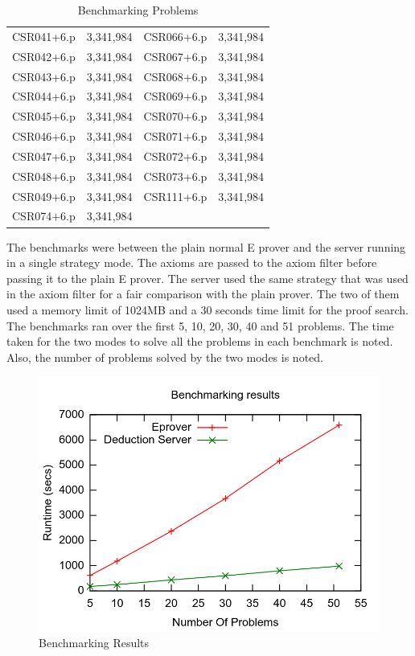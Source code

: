 \begin{table}[ht]
\begin{center}
\begin{tabular}{c|c||c|c}
      CSR041+6.p   & 3,341,984          & CSR066+6.p   & 3,341,984 \\
      CSR042+6.p   & 3,341,984          & CSR067+6.p   & 3,341,984 \\
      CSR043+6.p   & 3,341,984          & CSR068+6.p   & 3,341,984 \\
      CSR044+6.p   & 3,341,984          & CSR069+6.p   & 3,341,984 \\
      CSR045+6.p   & 3,341,984          & CSR070+6.p   & 3,341,984 \\
      CSR046+6.p   & 3,341,984          & CSR071+6.p   & 3,341,984 \\
      CSR047+6.p   & 3,341,984          & CSR072+6.p   & 3,341,984 \\
      CSR048+6.p   & 3,341,984          & CSR073+6.p   & 3,341,984 \\
      CSR049+6.p   & 3,341,984          & CSR111+6.p   & 3,341,984 \\
      CSR074+6.p   & 3,341,984          &              &           \\
      \bottomrule
    \end{tabular}
  \end{center}
\caption{Benchmarking Problems}
\label{Table:BenchmarkingProblems}
\end{table}

The benchmarks were between the plain normal E prover and the server running in a single strategy mode. The axioms are passed to the axiom filter before passing it to the plain E prover. The server used the same strategy that was used in the axiom filter for a fair comparison with the plain prover. The two of them used a memory limit of 1024MB and a 30 seconds time limit for the proof search. The benchmarks ran over the first 5, 10, 20, 30, 40 and 51 problems. The time taken for the two modes to solve all the problems in each benchmark is noted. Also, the number of problems solved by the two modes is noted.

\begin{figure}[ht!]
  \centering
  \includegraphics[width=150mm]{graphics/BenchmarkingResults.png}
  \caption{Benchmarking Results\label{benchmarking_results}}
\end{figure}

